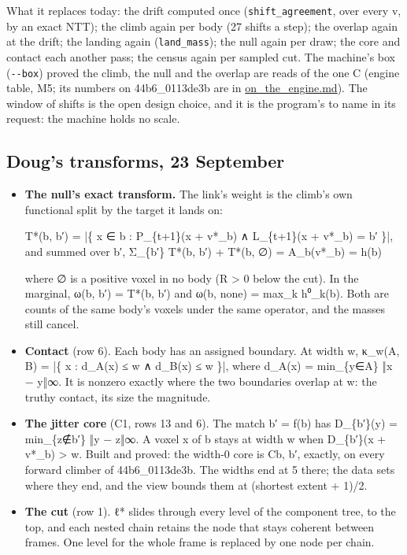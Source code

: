 What it replaces today: the drift computed once (\texttt{shift\_\allowbreak{}agreement}, over every v, by an exact NTT); the climb again per body (27 shifts a step); the overlap again at the drift; the landing again (\texttt{land\_\allowbreak{}mass}); the null again per draw; the core and contact each another pass; the census again per sampled cut. The machine's box (\texttt{-\allowbreak{}-\allowbreak{}box}) proved the climb, the null and the overlap are reads of the one C (engine table, M5; its numbers on 44b6\_\allowbreak{}0113de3b are in \hyperref[chap:on-the-engine]{on\_\allowbreak{}the\_\allowbreak{}engine.md}). The window of shifts is the open design choice, and it is the program's to name in its request: the machine holds no scale.

\subsection{\texorpdfstring{Doug's transforms, 23 September}{Doug's transforms, 23 September}}

\begin{itemize}
\item \textbf{The null's exact transform.} The link's weight is the climb's own functional split by the target it lands on:

T*(b, b′) = |\{ x ∈ b : P\_\allowbreak{}\{t+1\}(x + v*\_\allowbreak{}b) ∧ L\_\allowbreak{}\{t+1\}(x + v*\_\allowbreak{}b) = b′ \}|,  and summed over b′, Σ\_\allowbreak{}\{b′\} T*(b, b′) + T*(b, ∅) = A\_\allowbreak{}b(v*\_\allowbreak{}b) = h(b)

where ∅ is a positive voxel in no body (R > 0 below the cut). In the marginal, ω(b, b′) = T*(b, b′) and ω(b, none) = max\_\allowbreak{}k h⁰\_\allowbreak{}k(b). Both are counts of the same body's voxels under the same operator, and the masses still cancel.
\item \textbf{Contact} (row 6). Each body has an assigned boundary. At width w, κ\_\allowbreak{}w(A, B) = |\{ x : d\_\allowbreak{}A(x) ≤ w ∧ d\_\allowbreak{}B(x) ≤ w \}|, where d\_\allowbreak{}A(x) = min\_\allowbreak{}\{y∈A\} ‖x − y‖∞. It is nonzero exactly where the two boundaries overlap at w: the truthy contact, its size the magnitude.
\item \textbf{The jitter core} (C1, rows 13 and 6). The match b′ = f(b) has D\_\allowbreak{}\{b′\}(y) = min\_\allowbreak{}\{z∉b′\} ‖y − z‖∞. A voxel x of b stays at width w when D\_\allowbreak{}\{b′\}(x + v*\_\allowbreak{}b) > w. Built and proved: the width-0 core is Cb, b′, exactly, on every forward climber of 44b6\_\allowbreak{}0113de3b. The widths end at 5 there; the data sets where they end, and the view bounds them at (shortest extent + 1)/2.
\item \textbf{The cut} (row 1). ℓ* slides through every level of the component tree, to the top, and each nested chain retains the node that stays coherent between frames. One level for the whole frame is replaced by one node per chain.
\end{itemize}

